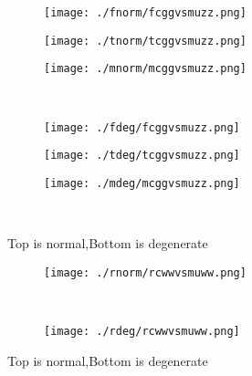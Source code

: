 \documentclass[aps,floats,floatfix,nofootinbib]{revtex4-1}
\begin{document}
\begin{center}
\begin{figure}
\begin{subfigure}{0.3\textwidth}
\texttt{[image: ./fnorm/fcggvsmuzz.png]}
\label{}
\end{subfigure}
\begin{subfigure}{0.3\textwidth}
\texttt{[image: ./tnorm/tcggvsmuzz.png]}
\label{}
\end{subfigure}
\begin{subfigure}{0.3\textwidth}
\texttt{[image: ./mnorm/mcggvsmuzz.png]}
\label{}
\end{subfigure}\\
\begin{subfigure}{0.3\textwidth}
\texttt{[image: ./fdeg/fcggvsmuzz.png]}
\label{}
\end{subfigure}
\begin{subfigure}{0.3\textwidth}
\texttt{[image: ./tdeg/tcggvsmuzz.png]}
\label{}
\end{subfigure}
\begin{subfigure}{0.3\textwidth}
\texttt{[image: ./mdeg/mcggvsmuzz.png]}
\label{}
\end{subfigure}\\
\caption{Top is normal,Bottom is degenerate}
\end{figure}
\end{center}

\begin{center}
\begin{figure}
\begin{subfigure}{0.95\textwidth}
\texttt{[image: ./rnorm/rcwwvsmuww.png]}
\label{}
\end{subfigure}\\
\begin{subfigure}{0.95\textwidth}
\texttt{[image: ./rdeg/rcwwvsmuww.png]}
\label{}
\end{subfigure}
\caption{Top is normal,Bottom is degenerate}
\end{figure}
\end{center}
\end{document}
